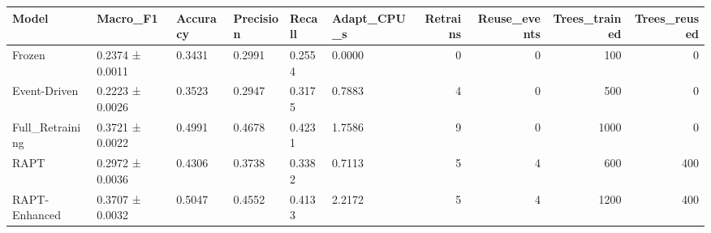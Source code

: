 \begin{tabular}{llllllrrrr}
\toprule
Model & Macro_F1 & Accuracy & Precision & Recall & Adapt_CPU_s & Retrains & Reuse_events & Trees_trained & Trees_reused \\
\midrule
Frozen & 0.2374 ± 0.0011 & 0.3431 & 0.2991 & 0.2554 & 0.0000 & 0 & 0 & 100 & 0 \\
Event-Driven & 0.2223 ± 0.0026 & 0.3523 & 0.2947 & 0.3175 & 0.7883 & 4 & 0 & 500 & 0 \\
Full_Retraining & 0.3721 ± 0.0022 & 0.4991 & 0.4678 & 0.4231 & 1.7586 & 9 & 0 & 1000 & 0 \\
RAPT & 0.2972 ± 0.0036 & 0.4306 & 0.3738 & 0.3382 & 0.7113 & 5 & 4 & 600 & 400 \\
RAPT-Enhanced & 0.3707 ± 0.0032 & 0.5047 & 0.4552 & 0.4133 & 2.2172 & 5 & 4 & 1200 & 400 \\
\bottomrule
\end{tabular}
